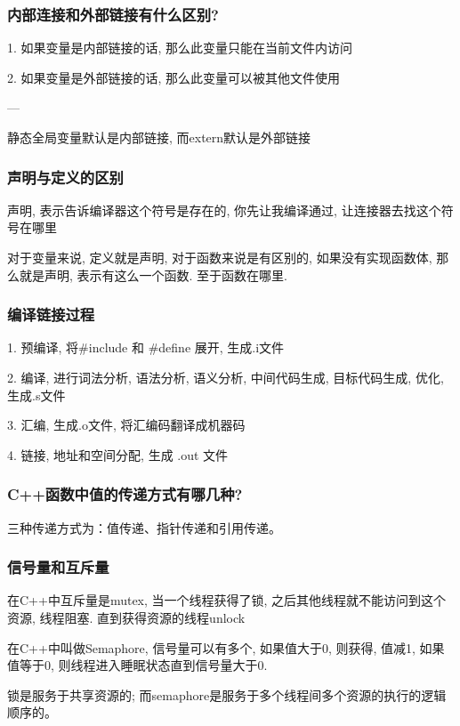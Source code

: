 \documentclass[UTF8]{ctexart}
\begin{document}
\subsubsection{内部连接和外部链接有什么区别?}
1. 如果变量是内部链接的话, 那么此变量只能在当前文件内访问 \par
2. 如果变量是外部链接的话, 那么此变量可以被其他文件使用 \par
---\par
静态全局变量默认是内部链接, 而extern默认是外部链接 \par
\subsubsection{声明与定义的区别}
声明, 表示告诉编译器这个符号是存在的, 你先让我编译通过, 让连接器去找这个符号在哪里 \par
对于变量来说, 定义就是声明, 对于函数来说是有区别的, 如果没有实现函数体, 那么就是声明, 表示有这么一个函数. 至于函数在哪里.
\subsubsection{编译链接过程}
1. 预编译, 将\#include 和 \#define 展开, 生成.i文件 \par
2. 编译, 进行词法分析, 语法分析, 语义分析, 中间代码生成, 目标代码生成, 优化, 生成.s文件 \par
3. 汇编, 生成.o文件, 将汇编码翻译成机器码 \par
4. 链接, 地址和空间分配, 生成 .out 文件 \par
\subsubsection{C++函数中值的传递方式有哪几种?}
三种传递方式为：值传递、指针传递和引用传递。
\subsubsection{信号量和互斥量}
在C++中互斥量是mutex, 当一个线程获得了锁, 之后其他线程就不能访问到这个资源, 线程阻塞. 直到获得资源的线程unlock \par
在C++中叫做Semaphore, 信号量可以有多个, 如果值大于0, 则获得, 值减1, 如果值等于0, 则线程进入睡眠状态直到信号量大于0. \par
锁是服务于共享资源的; 而semaphore是服务于多个线程间多个资源的执行的逻辑顺序的。\par
\end{document}
